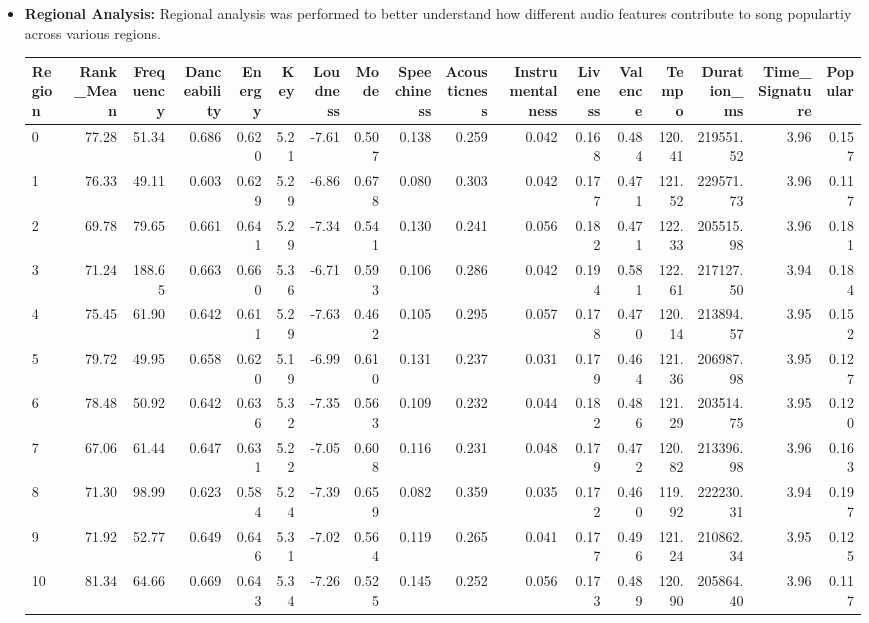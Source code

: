 \begin{itemize}
    \item \textbf{Regional Analysis: } Regional analysis was performed to better understand how different audio features contribute to song populartiy across various regions.
    \begin{table}[ht]
        \centering
        \begin{adjustbox}{width=\textwidth}
        \begin{tabular}{lrrrrrrrrrrrrrrrr}
        \toprule
        Region & Rank\_Mean & Frequency & Danceability & Energy & Key & Loudness & Mode & Speechiness & Acousticness & Instrumentalness & Liveness & Valence & Tempo & Duration\_ms & Time\_Signature & Popular \\
        \midrule
        0  & 77.28 & 51.34 & 0.686 & 0.620 & 5.21 & -7.61 & 0.507 & 0.138 & 0.259 & 0.042 & 0.168 & 0.484 & 120.41 & 219551.52 & 3.96 & 0.157 \\
        1  & 76.33 & 49.11 & 0.603 & 0.629 & 5.29 & -6.86 & 0.678 & 0.080 & 0.303 & 0.042 & 0.177 & 0.471 & 121.52 & 229571.73 & 3.96 & 0.117 \\
        2  & 69.78 & 79.65 & 0.661 & 0.641 & 5.29 & -7.34 & 0.541 & 0.130 & 0.241 & 0.056 & 0.182 & 0.471 & 122.33 & 205515.98 & 3.96 & 0.181 \\
        3  & 71.24 & 188.65 & 0.663 & 0.660 & 5.36 & -6.71 & 0.593 & 0.106 & 0.286 & 0.042 & 0.194 & 0.581 & 122.61 & 217127.50 & 3.94 & 0.184 \\
        4  & 75.45 & 61.90 & 0.642 & 0.611 & 5.29 & -7.63 & 0.462 & 0.105 & 0.295 & 0.057 & 0.178 & 0.470 & 120.14 & 213894.57 & 3.95 & 0.152 \\
        5  & 79.72 & 49.95 & 0.658 & 0.620 & 5.19 & -6.99 & 0.610 & 0.131 & 0.237 & 0.031 & 0.179 & 0.464 & 121.36 & 206987.98 & 3.95 & 0.127 \\
        6  & 78.48 & 50.92 & 0.642 & 0.636 & 5.32 & -7.35 & 0.563 & 0.109 & 0.232 & 0.044 & 0.182 & 0.486 & 121.29 & 203514.75 & 3.95 & 0.120 \\
        7  & 67.06 & 61.44 & 0.647 & 0.631 & 5.22 & -7.05 & 0.608 & 0.116 & 0.231 & 0.048 & 0.179 & 0.472 & 120.82 & 213396.98 & 3.96 & 0.163 \\
        8  & 71.30 & 98.99 & 0.623 & 0.584 & 5.24 & -7.39 & 0.659 & 0.082 & 0.359 & 0.035 & 0.172 & 0.460 & 119.92 & 222230.31 & 3.94 & 0.197 \\
        9  & 71.92 & 52.77 & 0.649 & 0.646 & 5.31 & -7.02 & 0.564 & 0.119 & 0.265 & 0.041 & 0.177 & 0.496 & 121.24 & 210862.34 & 3.95 & 0.125 \\
        10 & 81.34 & 64.66 & 0.669 & 0.643 & 5.34 & -7.26 & 0.525 & 0.145 & 0.252 & 0.056 & 0.173 & 0.489 & 120.90 & 205864.40 & 3.96 & 0.117 \\
        \bottomrule
        \end{tabular}
        \end{adjustbox}
        \end{table}
\end{itemize} 








